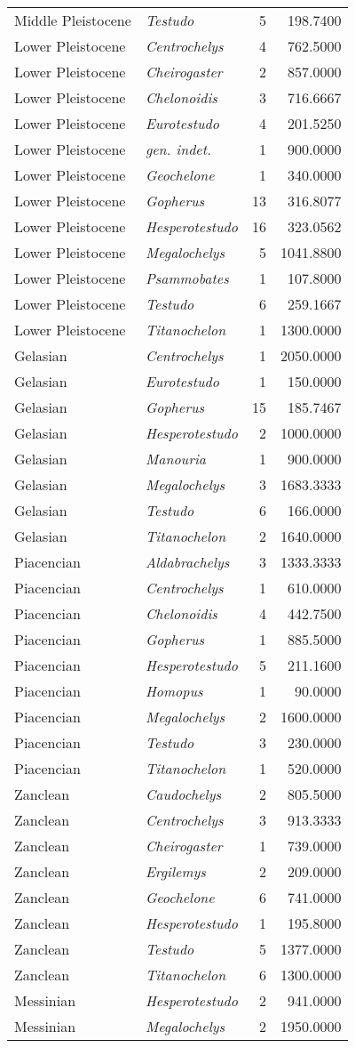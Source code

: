 \begin{longtable}[]{@{}llrr@{}}
	Middle Pleistocene & \textit{Testudo} & 5 & 198.7400\tabularnewline
	Lower Pleistocene & \textit{Centrochelys} & 4 & 762.5000\tabularnewline
	Lower Pleistocene & \textit{Cheirogaster} & 2 & 857.0000\tabularnewline
	Lower Pleistocene & \textit{Chelonoidis} & 3 & 716.6667\tabularnewline
	Lower Pleistocene & \textit{Eurotestudo} & 4 & 201.5250\tabularnewline
	Lower Pleistocene & \textit{gen. indet.} & 1 & 900.0000\tabularnewline
	Lower Pleistocene & \textit{Geochelone} & 1 & 340.0000\tabularnewline
	Lower Pleistocene & \textit{Gopherus} & 13 & 316.8077\tabularnewline
	Lower Pleistocene & \textit{Hesperotestudo} & 16 & 323.0562\tabularnewline
	Lower Pleistocene & \textit{Megalochelys} & 5 & 1041.8800\tabularnewline
	Lower Pleistocene & \textit{Psammobates} & 1 & 107.8000\tabularnewline
	Lower Pleistocene & \textit{Testudo} & 6 & 259.1667\tabularnewline
	Lower Pleistocene & \textit{Titanochelon} & 1 & 1300.0000\tabularnewline
	Gelasian & \textit{Centrochelys} & 1 & 2050.0000\tabularnewline
	Gelasian & \textit{Eurotestudo} & 1 & 150.0000\tabularnewline
	Gelasian & \textit{Gopherus} & 15 & 185.7467\tabularnewline
	Gelasian & \textit{Hesperotestudo} & 2 & 1000.0000\tabularnewline
	Gelasian & \textit{Manouria} & 1 & 900.0000\tabularnewline
	Gelasian & \textit{Megalochelys} & 3 & 1683.3333\tabularnewline
	Gelasian & \textit{Testudo} & 6 & 166.0000\tabularnewline
	Gelasian & \textit{Titanochelon} & 2 & 1640.0000\tabularnewline
	Piacencian & \textit{Aldabrachelys} & 3 & 1333.3333\tabularnewline
	Piacencian & \textit{Centrochelys} & 1 & 610.0000\tabularnewline
	Piacencian & \textit{Chelonoidis} & 4 & 442.7500\tabularnewline
	Piacencian & \textit{Gopherus} & 1 & 885.5000\tabularnewline
	Piacencian & \textit{Hesperotestudo} & 5 & 211.1600\tabularnewline
	Piacencian & \textit{Homopus} & 1 & 90.0000\tabularnewline
	Piacencian & \textit{Megalochelys} & 2 & 1600.0000\tabularnewline
	Piacencian & \textit{Testudo} & 3 & 230.0000\tabularnewline
	Piacencian & \textit{Titanochelon} & 1 & 520.0000\tabularnewline
	Zanclean & \textit{Caudochelys} & 2 & 805.5000\tabularnewline
	Zanclean & \textit{Centrochelys} & 3 & 913.3333\tabularnewline
	Zanclean & \textit{Cheirogaster} & 1 & 739.0000\tabularnewline
	Zanclean & \textit{Ergilemys} & 2 & 209.0000\tabularnewline
	Zanclean & \textit{Geochelone} & 6 & 741.0000\tabularnewline
	Zanclean & \textit{Hesperotestudo} & 1 & 195.8000\tabularnewline
	Zanclean & \textit{Testudo} & 5 & 1377.0000\tabularnewline
	Zanclean & \textit{Titanochelon} & 6 & 1300.0000\tabularnewline
	Messinian & \textit{Hesperotestudo} & 2 & 941.0000\tabularnewline
	Messinian & \textit{Megalochelys} & 2 & 1950.0000\tabularnewline

\end{longtable}
